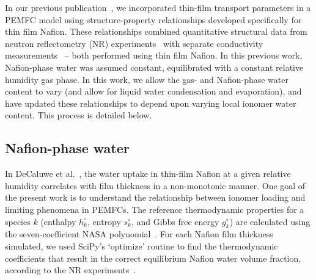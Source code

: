 \documentclass[final,3p,times,twocolumn]{elsarticle}    %
\begin{document}
In our previous publication~\cite{bib:randall_2020}, we incorporated thin-film transport parameters in a PEMFC model using structure-property relationships developed specifically for thin film Nafion. These relationships combined quantitative structural data from neutron reflectometry (NR) experiments~\cite{bib:decaluwe_2018} with separate conductivity measurements~\cite{bib:paul_mccreery_2014} -- both performed using thin film Nafion. In this previous work, Nafion-phase water was assumed constant, equilibrated with a constant relative humidity gas phase. In this work, we allow the gas- and Nafion-phase water content to vary (and allow for liquid water condensation and evaporation), and have updated these relationships to depend upon varying local ionomer water content. This process is detailed below.

\subsection{Nafion-phase water}
In DeCaluwe et al.~\cite{bib:decaluwe_2018}, the  water uptake in thin-film Nafion at a given relative humidity correlates with film thickness in a non-monotonic manner. One goal of the present work is to understand the relationship between ionomer loading and limiting phenomena in PEMFCs. %
The reference thermodynamic properties for a species $k$ (enthalpy $h_k^\circ$, entropy $s_k^\circ$, and Gibbs free energy $g_k^\circ$) are calculated using the seven-coefficient NASA polynomial~\cite{bib:mcbride_1993}. For each Nafion film thickness simulated, we used SciPy's `optimize' routine to find the thermodynamic coefficients that result in the correct equilibrium Nafion water volume fraction, according to the NR experiments~\cite{bib:decaluwe_2018}.
\end{document}

